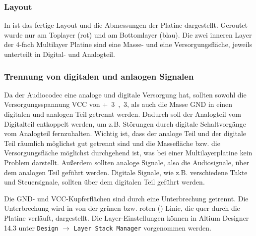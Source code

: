 \subsubsection{Layout}
In  ist das fertige Layout und die Abmessungen der Platine dargestellt. Geroutet wurde nur am Toplayer (rot) und am Bottomlayer (blau). Die zwei inneren Layer der 4-fach Multilayer Platine sind eine Masse- und eine Versorgungsfläche, jeweils unterteilt in Digital- und Analogteil.


\subsubsection{Trennung von digitalen und anlaogen Signalen}
Da der Audiocodec eine analoge und digitale Versorgung hat, sollten sowohl die Versorgungsspannung VCC von \unit{+3,3}{\volt}, als auch die Masse GND in einen digitalen und analogen Teil getrennt werden. Dadurch soll der Analogteil vom Digitalteil entkoppelt werden, um z.B. Störungen durch digitale Schaltvorgänge vom Analogteil fernzuhalten. Wichtig ist, dass der analoge Teil und der digitale Teil räumlich möglichst gut getrennt sind und die Massefläche bzw. die Versorgungsfläche möglichst durchgehend ist, was bei einer Multilayerplatine kein Problem darstellt. Außerdem sollten analoge Signale, also die Audiosignale, über dem analogen Teil geführt werden. Digitale Signale, wie z.B. verschiedene Takte und Steuersignale, sollten über dem digitalen Teil geführt werden.


Die GND- und VCC-Kupferflächen sind durch eine Unterbrechung getrennt. Die Unterbrechung wird in  von der grünen bzw. roten () Linie, die quer durch die Platine verläuft, dargestellt. Die Layer-Einstellungen können in Altium Designer 14.3 unter \texttt{Design} $\rightarrow$ \texttt{Layer Stack Manager} vorgenommen werden.


